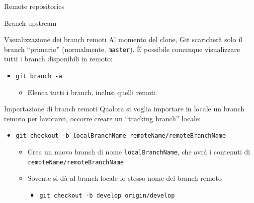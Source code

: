 \documentclass[xcolor=dvipsnames,presentation]{beamer}
\begin{document}
\begin{frame}{Remote repositories}
\begin{block}{Branch upstream}
	\end{block}
	\begin{block}{Visualizzazione dei branch remoti}
		Al momento del clone, Git scaricherà solo il branch ``primario'' (normalmente, \texttt{master}). È possibile comunque visualizzare tutti i branch disponibili in remoto:
		\begin{itemize}
			\item \texttt{git branch -a}
			\begin{itemize}
				\item Elenca tutti i branch, inclusi quelli remoti.
			\end{itemize}
		\end{itemize}
	\end{block}
	\begin{block}{Importazione di branch remoti}
		Qualora si voglia importare in locale un branch remoto per lavorarci, occorre creare un ``tracking branch'' locale:
		\begin{itemize}
			\item \texttt{git checkout -b localBranchName remoteName/remoteBranchName}
			\begin{itemize}
				\item Crea un nuovo branch di nome \texttt{localBranchName}, che avrà i contenuti di \texttt{remoteName/remoteBranchName}
				\item Sovente si dà al branch locale lo stesso nome del branch remoto
				\begin{itemize}
					\item \texttt{git checkout -b develop origin/develop}
				\end{itemize}
			\end{itemize}
		\end{itemize}
	\end{block}
\end{frame}
\end{document}
